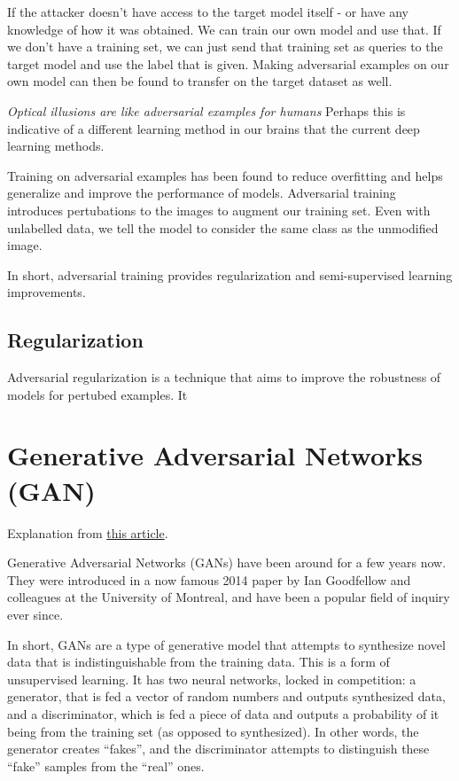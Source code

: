 If the attacker doesn't have access to the target model itself - or have any knowledge of how it was obtained. We can train our own model and use that. If we don't have a training set, we can just send that training set as queries to the target model and use the label that is given. Making adversarial examples on our own model can then be found to transfer on the target dataset as well. 
 
 \textit{Optical illusions are like adversarial examples for humans} Perhaps this is indicative of a different learning method in our brains that the current deep learning methods.
 
 Training on adversarial examples has been found to reduce overfitting and helps generalize and improve the performance of models. Adversarial training introduces pertubations to the images to augment our training set. Even with unlabelled data, we tell the model to consider the same class as the unmodified image. 
 
 In short, adversarial training provides regularization and semi-supervised learning improvements.
 
 \subsection{Regularization}
 
 Adversarial regularization is a technique that aims to improve the robustness of models for pertubed examples. It 
 
 \section{Generative Adversarial Networks (GAN)}

Explanation from \href{https://towardsdatascience.com/progan-how-nvidia-generated-images-of-unprecedented-quality-51c98ec2cbd2}{this article}.
 
Generative Adversarial Networks (GANs) have been around for a few years now. They were introduced in a now famous 2014 paper by Ian Goodfellow and colleagues at the University of Montreal, and have been a popular field of inquiry ever since.

In short, GANs are a type of generative model that attempts to synthesize novel data that is indistinguishable from the training data. This is a form of unsupervised learning. It has two neural networks, locked in competition: a generator, that is fed a vector of random numbers and outputs synthesized data, and a discriminator, which is fed a piece of data and outputs a probability of it being from the training set (as opposed to synthesized). In other words, the generator creates “fakes”, and the discriminator attempts to distinguish these “fake” samples from the “real” ones.

